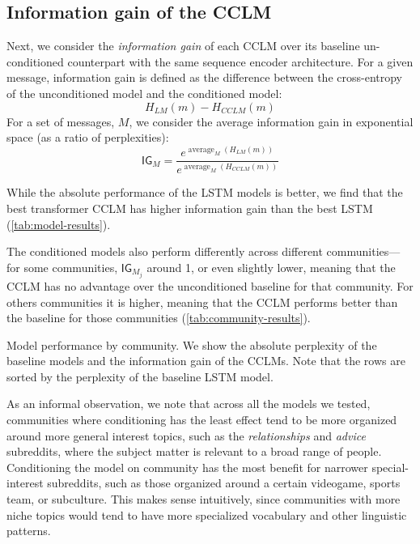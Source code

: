 \documentclass[11pt,a4paper]{article}
\newcommand\jp[1]{\todo[backgroundcolor=blue!10]{JP: #1}}
\newcommand\IG{\mathsf{IG}}
\DeclareMathOperator*{\avg}{average}
\begin{document}
\subsection{Information gain of the CCLM}

Next, we consider the \emph{information gain} of each CCLM over its baseline
un-conditioned counterpart with the same sequence encoder architecture.
For a given message, information gain is defined as the difference
between the cross-entropy of the unconditioned model and the conditioned model:
\[H_{LM}(m) - H_{CCLM}(m)\]
For a set of messages, $M$, we consider the average information gain
in exponential space (as a ratio of perplexities):
\[\IG_M = \frac{e^{\avg_M(H_{LM}(m))}}{e^{\avg_M(H_{CCLM}(m))}}\]


While the absolute performance of the LSTM models is better,
we find that the best transformer CCLM has higher information gain 
than the best LSTM (\cref{tab:model-results}).

The conditioned models also perform differently across different communities---%
for some communities, $\IG_{M_j}$ around \num{1}, or even slightly lower,
meaning that the CCLM has no advantage over the unconditioned baseline for that community.
For others communities it is higher, meaning that the CCLM performs better than 
the baseline for those communities (\cref{tab:community-results}).

\begin{table*}
  \centering
  
  \caption{
    Model performance by community. We show the absolute perplexity 
    of the baseline models and the information gain of the CCLMs.
    Note that the rows are sorted by the perplexity of the baseline
    LSTM model.
}
  \label{tab:community-results}
\end{table*}


As an informal observation, we note that across all the models we
tested, communities where conditioning has the least effect tend to be
more organized around more general interest topics, such as the
\emph{relationships} and \emph{advice} subreddits, where the subject
matter is relevant to a broad range of people.  Conditioning the model
on community has the most benefit for narrower special-interest
subreddits, such as those organized around a certain videogame, sports
team, or subculture.  This makes sense intuitively, since communities
with more niche topics would tend to have more specialized vocabulary
and other linguistic patterns.
\end{document}
